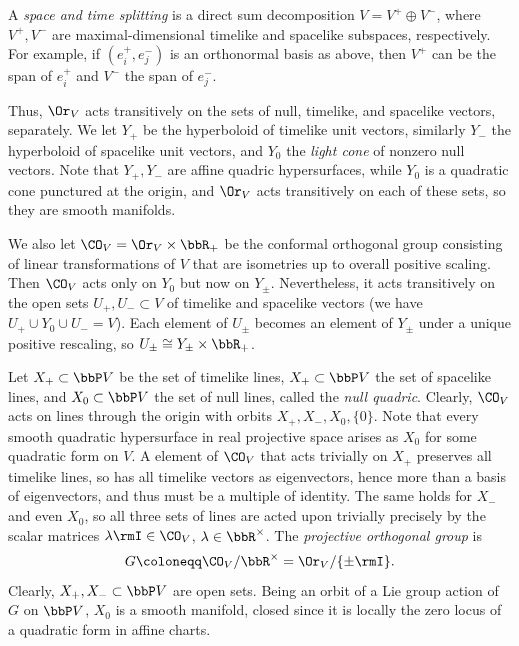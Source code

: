 A \emph{space and time splitting} is a direct sum decomposition $V=V^+\oplus V^-$, where $V^+,V^-$ are maximal-dimensional timelike and spacelike subspaces, respectively. For example, if $(e_i^+,e_j^-)$ is an orthonormal basis as above, then $V^+$ can be the span of $e_i^+$ and $V^-$ the span of $e_j^-$.

Thus, $\Or_V$ acts transitively on the sets of null, timelike, and spacelike vectors, separately. We let $Y_+$ be the hyperboloid of timelike unit vectors, similarly $Y_-$ the hyperboloid of spacelike unit vectors, and $Y_0$ the \emph{light cone} of nonzero null vectors. Note that $Y_+,Y_-$ are affine quadric hypersurfaces, while $Y_0$ is a quadratic cone punctured at the origin, and $\Or_V$ acts transitively on each of these sets, so they are smooth manifolds. 

We also let $\CO_V=\Or_V\times\bbR_+$ be the conformal orthogonal group consisting of linear transformations of $V$ that are isometries up to overall positive scaling. Then $\CO_V$ acts only on $Y_0$ but now on $Y_\pm$. Nevertheless, it acts transitively on the open sets $U_+,U_-\subset V$ of timelike and spacelike vectors (we have $U_+\cup Y_0\cup U_-=V$). Each element of $U_\pm$ becomes an element of $Y_\pm$ under a unique positive rescaling, so $U_\pm\cong Y_\pm\times\bbR_+$.

Let $X_+\subset \bbP V$ be the set of timelike lines, $X_+\subset \bbP V$ the set of spacelike lines, and $X_0\subset \bbP V$ the set of null lines, called the \emph{null quadric}. Clearly, $\CO_V$ acts on lines through the origin with orbits $X_+,X_-,X_0,\{0\}$. Note that every smooth quadratic hypersurface in real projective space arises as $X_0$ for some quadratic form on $V$. A element of $\CO_V$ that acts trivially on $X_+$ preserves all timelike lines, so has all timelike vectors as eigenvectors, hence more than a basis of eigenvectors, and thus must be a multiple of identity. The same holds for $X_-$ and even $X_0$, so all three sets of lines are acted upon trivially precisely by the scalar matrices $\lambda\rmI\in\CO_V$, $\lambda\in\bbR^\times$. The \emph{projective orthogonal group} is 
\[G\coloneqq \CO_V\slash \bbR^\times=\Or_V\slash \{\pm \rmI\}.\]
Clearly, $X_+,X_-\subset \bbP V$ are open sets. Being an orbit of a Lie group action of $G$ on $\bbP V$, $X_0$ is a smooth manifold, closed since it is locally the zero locus of a quadratic form in affine charts.

